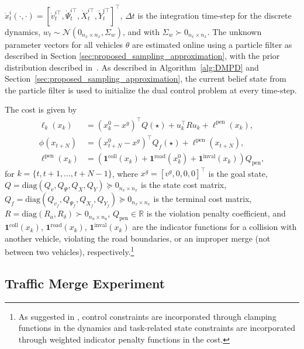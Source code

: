 \documentclass[letterpaper, 10 pt, conference]{IEEEconf}
\renewcommand{\Re}{\mathbb{R}}
\begin{document}
$\dot{x}_{t}^{i}(\cdot, \cdot) = [\dot{v}_{t}^{i \top}, \dot{\Psi}_{t}^{i \top}, \dot{X}_{t}^{i \top}, \dot{Y}_{t}^{i \top}]^{\top}$, 
$\Delta t$ is the integration time-step for the discrete dynamics, 
$w_{t} \sim \mathcal{N}(0_{n_x \times n_x}, \Sigma_w)$, 
and with $\Sigma_w \succ 0_{n_x \times n_x}$.
The unknown parameter vectors for all vehicles $\theta$ are estimated online using a particle filter as described in Section \ref{sec:proposed_sampling_approximation}, with the prior distribution described in~\cite{knaup2024active}.
As described in Algorithm~\ref{alg:DMPD} and Section~\ref{sec:proposed_sampling_approximation}, the current belief state from the particle filter is used to initialize the dual control problem at every time-step.

The cost is given by
\begin{subequations}
\begin{align}
    \ell_k(x_k) &= (x_k^{0} - x^g)^\top Q (\star) + u_{k}^{\top} R u_{k} + \ell^\text{pen}(x_k), \\
    \phi(x_{t+N}) &= (x_{t+N}^{0} - x^g)^\top Q_f (\star) + \ell^\text{pen}(x_{t+N}), \\
    \ell^\text{pen}(x_k) &= (\mathbf{1}^{\text{coll}}(x_k) + \mathbf{1}^\text{road}(x_k^{0}) + \mathbf{1}^\text{inval}(x_k)) Q_{\mathrm{pen}},
\end{align}
\end{subequations}
for $k=\{t, t+1,\dots,t+N-1 \}$,
where $x^g = [v^g, 0, 0, 0]^\top$ is the goal state, $Q = \text{diag}(Q_{v}, Q_{\Psi}, Q_{X}, Q_{Y}) \succeq 0_{n_x \times n_x}$ is the state cost matrix, $Q_f = \text{diag}(Q_{v_f}, Q_{\Psi_f}, Q_{X_f}, Q_{Y_f}) \succeq 0_{n_x \times n_x}$ is the terminal cost matrix, $R = \text{diag}(R_{a}, R_{\delta}) \succ 0_{n_u \times n_u}$, $Q_{\mathrm{pen}} \in \Re$ is the violation penalty coefficient, and $\mathbf{1}^{\text{coll}}(x_k)$, $\mathbf{1}^\text{road}(x_k)$, $\mathbf{1}^\text{inval}(x_k)$ are the indicator functions for a collision with another vehicle, violating the road boundaries, or an improper merge (not between two vehicles), respectively.\footnote{
As suggested in \cite{williams2018information}, control constraints are incorporated through clamping functions in the dynamics and task-related state constraints are incorporated through weighted indicator penalty functions in the cost.}

\subsection{Traffic Merge Experiment} \label{sec:traffic_merge_experiment}
\end{document}
